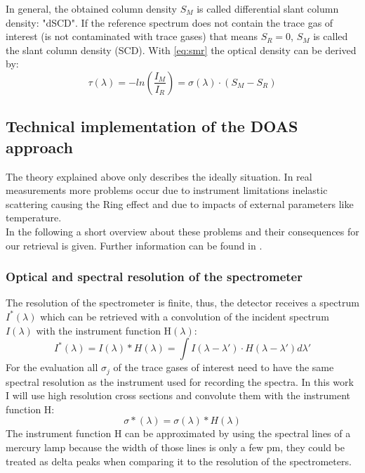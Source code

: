 \documentclass  [
  paper    = a4,
  BCOR     = 10mm,
  twoside,
  fontsize = 12pt,
  fleqn,
  toc      = bibnumbered,
  toc      = listofnumbered,
  numbers  = noendperiod,
  headings = normal,
  listof   = leveldown,
  version  = 3.03
]                                       {scrreprt}
\begin{document}
In general, the obtained column density $S_{M}$ is called differential slant column density: "dSCD". If the reference spectrum does not contain the trace gas of interest (is not contaminated with trace gases) that means $S_{R} = 0$, $S_{M}$ is called the slant column density (SCD). 
With \cref{eq:smr} the optical density can be derived by:
\begin{equation}
\tau\left(\lambda\right) = -ln\left(\frac{I_{M}}{I_{R}}\right) = \sigma\left(\lambda\right)\cdot\left(S_{M}-S_{R}\right)
\end{equation}
%


\subsection{Technical implementation of the DOAS approach}
The theory explained above only describes the ideally situation. In real measurements more problems occur due to instrument limitations inelastic scattering causing the Ring effect and due to impacts of external parameters like temperature.\\
In the following a short overview about these problems and their consequences for our retrieval is given. Further information can be found in \citet{lubcke2014optical}.\\
\subsubsection*{Optical and spectral resolution of the spectrometer}
The resolution of the spectrometer is finite, thus, the detector receives a spectrum $I^{*}\left(\lambda\right)$ which can be retrieved with a convolution of the incident spectrum $I\left(\lambda\right)$ with the instrument function H$\left(\lambda\right)$:
\begin{equation}
I^{*}\left(\lambda\right) = I\left(\lambda\right)*H\left(\lambda\right)=\int I\left(\lambda-\lambda{'}\right)\cdot H\left(\lambda-\lambda{'}\right)d\lambda{'}
\end{equation} 
For the evaluation all $\sigma_{j}$  of the trace gases of interest need to have the same spectral resolution as the instrument used for recording the spectra. In this work I will use high resolution cross sections and convolute them with the instrument function H:
\begin{equation}
\sigma{*}\left(\lambda\right) = \sigma\left(\lambda\right)*H\left(\lambda\right)
\end{equation}
The instrument function H can be approximated by using the spectral lines of a mercury lamp because the width of those lines is only a few pm, they could be treated as delta peaks when comparing it to the resolution of the spectrometers.
\end{document}
